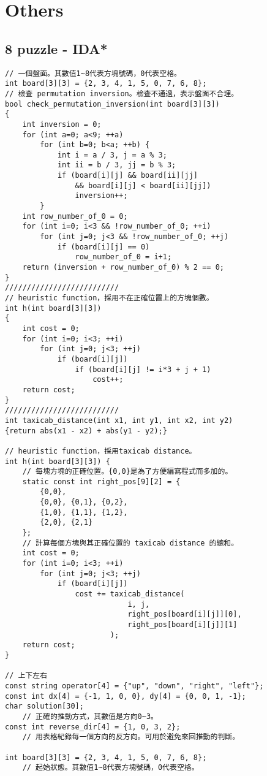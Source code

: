 \documentclass[11pt,twocolumn,a4paper]{article}
\begin{document}

\newpage
\section{Others}
\subsection{8 puzzle - IDA*}
\begin{lstlisting}[label=8 puzzle - IDA*]
// 一個盤面。其數值1~8代表方塊號碼，0代表空格。
int board[3][3] = {2, 3, 4, 1, 5, 0, 7, 6, 8};
// 檢查 permutation inversion。檢查不通過，表示盤面不合理。
bool check_permutation_inversion(int board[3][3])
{
	int inversion = 0;
	for (int a=0; a<9; ++a)
		for (int b=0; b<a; ++b) {
			int i = a / 3, j = a % 3;
			int ii = b / 3, jj = b % 3;
			if (board[i][j] && board[ii][jj]
				&& board[i][j] < board[ii][jj])
				inversion++;
		}
	int row_number_of_0 = 0;
	for (int i=0; i<3 && !row_number_of_0; ++i)
		for (int j=0; j<3 && !row_number_of_0; ++j)
			if (board[i][j] == 0)
				row_number_of_0 = i+1;
	return (inversion + row_number_of_0) % 2 == 0;
}
//////////////////////////
// heuristic function，採用不在正確位置上的方塊個數。
int h(int board[3][3])
{
	int cost = 0;
	for (int i=0; i<3; ++i)
		for (int j=0; j<3; ++j)
			if (board[i][j])
				if (board[i][j] != i*3 + j + 1)
					cost++;
	return cost;
}
//////////////////////////
int taxicab_distance(int x1, int y1, int x2, int y2)
{return abs(x1 - x2) + abs(y1 - y2);}
 
// heuristic function，採用taxicab distance。
int h(int board[3][3]) {
	// 每塊方塊的正確位置。{0,0}是為了方便編寫程式而多加的。
	static const int right_pos[9][2] = {
		{0,0},
		{0,0}, {0,1}, {0,2},
		{1,0}, {1,1}, {1,2},
		{2,0}, {2,1}
	};
	// 計算每個方塊與其正確位置的 taxicab distance 的總和。
	int cost = 0;
	for (int i=0; i<3; ++i)
		for (int j=0; j<3; ++j)
			if (board[i][j])
				cost += taxicab_distance(
							i, j,
							right_pos[board[i][j]][0],
							right_pos[board[i][j]][1]
						);
	return cost;
}

// 上下左右
const string operator[4] = {"up", "down", "right", "left"};
const int dx[4] = {-1, 1, 0, 0}, dy[4] = {0, 0, 1, -1};
char solution[30];
	// 正確的推動方式，其數值是方向0~3。
const int reverse_dir[4] = {1, 0, 3, 2};
	// 用表格紀錄每一個方向的反方向。可用於避免來回推動的判斷。

int board[3][3] = {2, 3, 4, 1, 5, 0, 7, 6, 8};
	// 起始狀態。其數值1~8代表方塊號碼，0代表空格。


\end{lstlisting}
\end{document}

